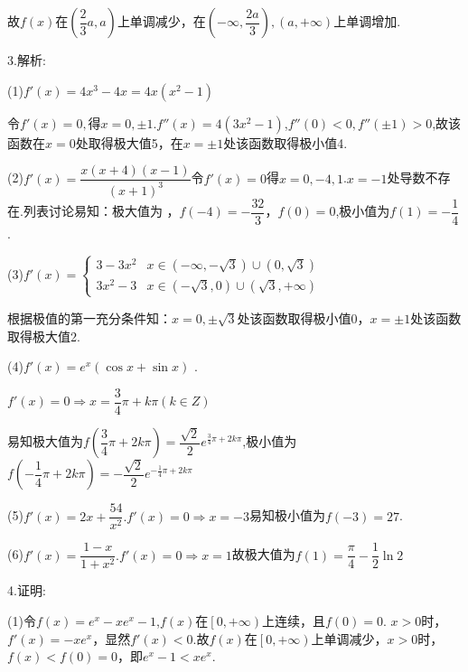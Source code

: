 故$f(x)$在$\left( {\dfrac{2}{3}a,a} \right)$上单调减少，在$\left( { - \infty ,\dfrac{{2a}}{3}} \right),\left( {a, + \infty } \right)$上单调增加.

3.解析:

(1)$f'\left( x \right) = 4{x^3} - 4x = 4x\left( {{x^2} - 1} \right)$

令$f'\left( x \right) = 0,$得$x = 0, \pm 1$.$f''\left( x \right) = 4\left( {3{x^2} - 1} \right)$,$f''\left( 0 \right) < 0,f''\left( { \pm 1} \right) > 0$,故该函数在$x = 0$处取得极大值5，在$x =  \pm 1$处该函数取得极小值4.

(2)$f'\left( x \right) = \dfrac{{x\left( {x + 4} \right)\left( {x - 1} \right)}}{{{{\left( {x + 1} \right)}^3}}}$令$f'\left( x \right) = 0$得$x = 0, - 4,1$.$x =  - 1$处导数不存在.列表讨论易知：极大值为 ，$f\left( { - 4} \right) =  - \dfrac{{32}}{3}$，$f\left( 0 \right) = 0$,极小值为$f\left( 1 \right) =  - \dfrac{1}{4}$.

(3)$f'\left( x \right) = \left\{ {\begin{array}{*{20}{l}}
{3 - 3{x^2}}&{x \in \left( { - \infty , - \sqrt 3 } \right) \cup \left( {0,\sqrt 3 } \right)}\\
{3{x^2} - 3}&{x \in \left( { - \sqrt 3 ,0} \right) \cup \left( {\sqrt 3 , + \infty } \right)}
\end{array}} \right.$

根据极值的第一充分条件知：$x = 0, \pm \sqrt 3 $处该函数取得极小值0，$x =  \pm 1$处该函数取得极大值2.

(4)$f'\left( x \right) = {e^x}\left( {\cos x + \sin x} \right)$ .

$f'\left( x \right) = 0 \Rightarrow x = \dfrac{3}{4}\pi  + k\pi \left( {k \in Z} \right)$

易知极大值为$f\left( {\dfrac{3}{4}\pi  + 2k\pi } \right) = \dfrac{{\sqrt 2 }}{2}{e^{\frac{3}{4}\pi  + 2k\pi }}$,极小值为$f\left( { - \dfrac{1}{4}\pi  + 2k\pi } \right) =  - \dfrac{{\sqrt 2 }}{2}{e^{ - \frac{1}{4}\pi  + 2k\pi }}$

(5)$f'\left( x \right) = 2x + \dfrac{{54}}{{{x^2}}}.f'\left( x \right) = 0 \Rightarrow x =  - 3$易知极小值为$f\left( { - 3} \right) = 27$.

(6)$f'\left( x \right) = \dfrac{{1 - x}}{{1 + {x^2}}}.f'\left( x \right) = 0 \Rightarrow x = 1$故极大值为$f\left( 1 \right) = \dfrac{\pi }{4} - \dfrac{1}{2}\ln 2$

4.证明:

(1)令$f\left( x \right) = {e^x} - x{e^x} - 1$,$f\left( x \right)$在$\left[ {0, + \infty } \right)$上连续，且$f\left( 0 \right) = 0$.
$x > 0$时，$f'\left( x \right) =  - x{e^x}$，显然$f'\left( x \right) < 0$.故$f\left( x \right)$在$\left[ {0, + \infty } \right)$上单调减少，$x > 0$时，$f\left( x \right) < f\left( 0 \right) = 0$，即${e^x} - 1 < x{e^x}$.

